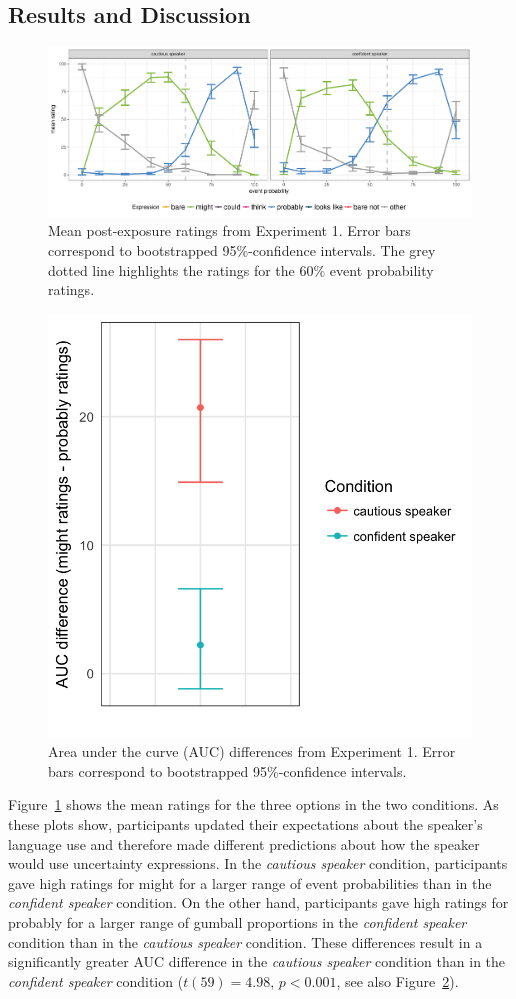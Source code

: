 \documentclass[lucida,biblatex]{sp} %
\begin{document}
\subsection{Results and Discussion}

\begin{figure}
\includegraphics[width=\textwidth]{plots/exp-1-ratings.pdf}
\caption{Mean post-exposure ratings from Experiment 1. Error bars correspond to bootstrapped 95\%-confidence intervals.  The grey dotted line highlights the ratings for the 60\% event probability ratings.  \label{fig:adaptation-results-prod}}
\end{figure}

\begin{figure}
\center
\includegraphics[width=.5\textwidth]{plots/adaptation-auc-production.png}
\caption{Area under the curve (AUC) differences from Experiment 1. Error bars correspond to bootstrapped 95\%-confidence intervals.  \label{fig:adaptation-auc-prod}}
\end{figure}

Figure~\ref{fig:adaptation-results-prod} shows the mean ratings for the three options in the two conditions. As these plots show, participants updated their expectations about the speaker's language use and therefore made different predictions about how the speaker would use uncertainty expressions. In the \emph{cautious speaker} condition, participants gave high ratings for {\sc might} for a larger range of event probabilities than in the \emph{confident speaker} condition. On the other hand, participants gave high ratings for {\sc probably} for a larger range of gumball proportions in the \emph{confident speaker} condition than in the \emph{cautious speaker} condition. These differences result in a significantly greater AUC difference in the \emph{cautious speaker} condition than in the \emph{confident speaker} condition ($t(59) = 4.98$, $p < 0.001$, see also Figure~\ref{fig:adaptation-auc-prod}).
\end{document}
